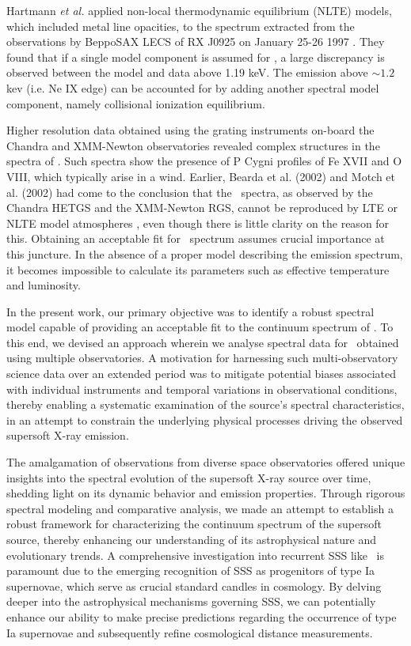 		Hartmann \textit{et al.} applied non-local thermodynamic equilibrium (NLTE) models, which included metal line opacities, to the spectrum extracted from the observations by BeppoSAX LECS of RX J0925 on January 25-26 1997 \cite{hartmann1999constraining}. They found that if a single model component is assumed for \source, a large discrepancy is observed between the model and data above 1.19 keV. The emission above $\sim 1.2$ kev (i.e. Ne IX edge) can be accounted for by adding another spectral model component, namely collisional ionization equilibrium.
		
		Higher resolution data obtained using the grating instruments on-board the Chandra and XMM-Newton observatories revealed complex structures in the spectra of \source. Such spectra show the presence of P Cygni profiles of Fe XVII and O VIII, which typically arise in a wind. Earlier, Bearda et al. (2002) and Motch et al. (2002) had come to the conclusion that the \source\ spectra, as observed by the Chandra HETGS and the XMM-Newton RGS, cannot be reproduced by LTE or NLTE model atmospheres \cite{beardaChandra2002AA,motchXmmNewton2002AA}, even though there is little clarity on the reason for this. Obtaining an acceptable fit for \source\ spectrum assumes crucial importance at this juncture. In the absence of a proper model describing the emission spectrum, it becomes impossible to calculate its parameters such as effective temperature and luminosity.
		
		In the present work, our primary objective was to identify a robust spectral model capable of providing an acceptable fit to the continuum spectrum of \source. To this end, we devised an approach wherein we analyse spectral data for \source\ obtained using multiple observatories. A motivation for harnessing such multi-observatory science data over an extended period was to mitigate potential biases associated with individual instruments and temporal variations in observational conditions, thereby enabling a systematic examination of the source's spectral characteristics, in an attempt to constrain the underlying physical processes driving the observed supersoft X-ray emission.
		
		The amalgamation of observations from diverse space observatories offered unique insights into the spectral evolution of the supersoft X-ray source over time, shedding light on its dynamic behavior and emission properties. Through rigorous spectral modeling and comparative analysis, we made an attempt to establish a robust framework for characterizing the continuum spectrum of the supersoft source, thereby enhancing our understanding of its astrophysical nature and evolutionary trends. A comprehensive investigation into recurrent SSS like \source\ is paramount due to the emerging recognition of SSS as progenitors of type Ia supernovae, which serve as crucial standard candles in cosmology. By delving deeper into the astrophysical mechanisms governing SSS, we can potentially enhance our ability to make precise predictions regarding the occurrence of type Ia supernovae and subsequently refine cosmological distance measurements.
    
